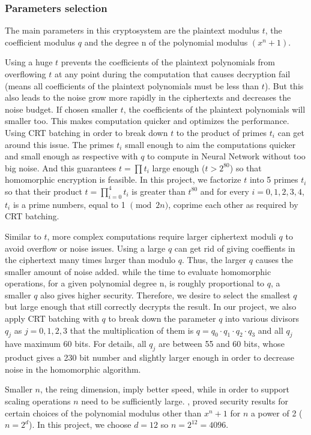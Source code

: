 \documentclass[A4paper,12pt]{article}
\begin{document}
	\subsubsection{Parameters selection}
The main parameters in this cryptosystem are the plaintext modulus $t$, the coefficient modulus $q$ and the degree n of the polynomial modulus $(x^n + 1)$.

Using a huge $t$ prevents the coefficients of the plaintext polynomials from overflowing $t$ at any point during the computation that causes decryption fail (means all coefficients of the plaintext polynomials must be less than $t$). But this also leads to the noise grow more rapidly in the ciphertexts and decreases the noise budget. If chosen smaller $t$, the coefficients of the plaintext polynomials will smaller too. This makes computation quicker and optimizes the performance. Using CRT batching in order to break down $t$ to the product of primes $t_i$ can get around this issue. The primes $t_i$ small enough to aim the computations quicker and small enough as respective with $q$ to compute in Neural Network without too big noise. And this guarantees $t = \prod t_i$ large enough ($t > 2^{80}$) so that homomorphic encryption is feasible. In this project, we factorize $t$ into 5 primes $t_i$ so that their product $t = \prod_{i=0}^{4}t_i$ is greater than $t^{80}$ and for every $i = 0,1,2,3,4$, $t_i$ is a prime numbers, equal to 1 $\pmod {2n}$, coprime each other as required by CRT batching.

Similar to $t$, more complex computations require larger ciphertext moduli $q$ to avoid overflow or noise issues. Using a large $q$ can get rid of giving coeffients in the ciphertext many times larger than modulo $q$. Thus, the larger $q$ causes the smaller amount of noise added. while the time to evaluate homomorphic operations, for a given polynomial degree n, is roughly proportional to $q$, a smaller $q$ also gives higher security. Therefore, we desire to select the smallest $q$ but large enough that still correctly decrypts the result. In our project, we also apply CRT batching with $q$ to break down the parameter $q$ into various divisors $q_j$ as $j = 0,1,2,3$ that the multiplication of them is $q = q_0 \cdot q_1 \cdot q_2 \cdot q_3$ and all $q_j$ have maximum 60 bits. For details, all $q_j$ are between 55 and 60 bits, whose product gives a 230 bit number and slightly larger enough in order to  decrease noise in the homomorphic algorithm.

Smaller $n$, the reing dimension, imply better speed, while in order to support scaling operations $n$ need to be sufficiently large. \cite{npowe2_1}, \cite{npowe2_2} proved security results for certain choices of the polynomial modulus other than $x^n + 1$ for $n$ a power of 2 ($n = 2^d$). In this project, we choose $d = 12$ so $n = 2^{12} = 4096$.
\end{document}
